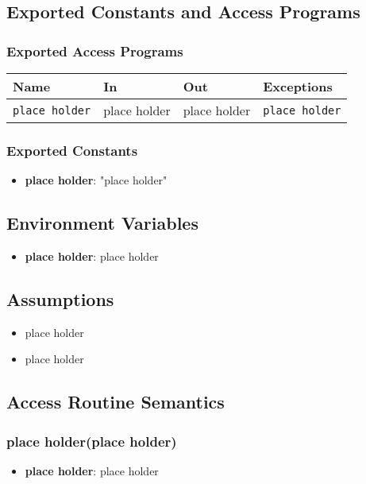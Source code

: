 \documentclass[12pt, titlepage]{article}
\begin{document}
\subsection{Exported Constants and Access Programs}
\subsubsection{Exported Access Programs}
\begin{tabular}{|l|l|l|l|}
    \hline
    \textbf{Name} & \textbf{In} & \textbf{Out} & \textbf{Exceptions} \\
    \hline 
    \texttt{place holder} & place holder & place holder & \texttt{place holder} \\
    \hline
\end{tabular}

\subsubsection{Exported Constants}
\begin{itemize}
\item \textbf{place holder}: "place holder" 
\end{itemize}

\subsection{Environment Variables}
\begin{itemize}
\item \textbf{place holder}: place holder
\end{itemize}

\subsection{Assumptions}
\begin{itemize}
    \item place holder
    \item place holder
\end{itemize}


\subsection{Access Routine Semantics}
\subsubsection{place holder(place holder)}
\begin{itemize}
    \item \textbf{place holder}: place holder
\end{itemize}
\end{document}

